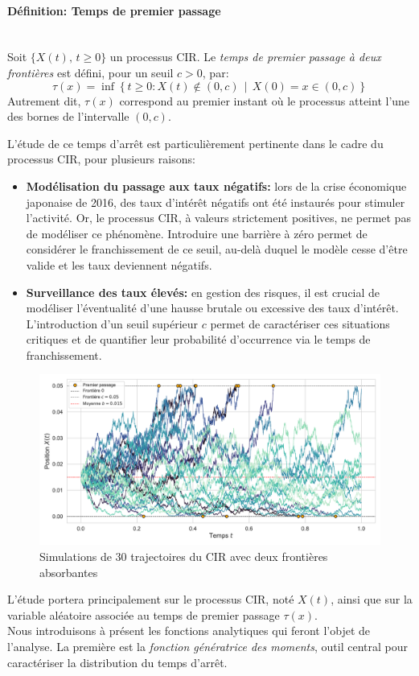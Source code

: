 \paragraph{Définition: Temps de premier passage}\mbox{}\\
Soit $\{X(t),\, t \geq 0\}$ un processus \acs{CIR}. Le \textit{temps de premier passage à deux frontières} est défini, pour un seuil $c > 0$, par:
\begin{equation}\label{fpt_definition}
    \tau(x) = \inf \left\{ t \geq 0: X(t) \notin (0, c) \,\middle|\, X(0) = x \in (0, c) \right\}
\end{equation}
Autrement dit, $\tau(x)$ correspond au premier instant où le processus atteint l'une des bornes de l'intervalle $(0, c)$. 

L'étude de ce temps d'arrêt est particulièrement pertinente dans le cadre du processus \acs{CIR}, pour plusieurs raisons:
\begin{itemize}
    \item \textbf{Modélisation du passage aux taux négatifs:} lors de la crise économique japonaise de 2016, des taux d'intérêt négatifs ont été instaurés pour stimuler l'activité. Or, le processus \acs{CIR}, à valeurs strictement positives, ne permet pas de modéliser ce phénomène. Introduire une barrière à zéro permet de considérer le franchissement de ce seuil, au-delà duquel le modèle cesse d'être valide et les taux deviennent négatifs.
    \item \textbf{Surveillance des taux élevés:} en gestion des risques, il est crucial de modéliser l'éventualité d'une hausse brutale ou excessive des taux d'intérêt. L'introduction d'un seuil supérieur $c$ permet de caractériser ces situations critiques et de quantifier leur probabilité d'occurrence via le temps de franchissement.
\end{itemize}
\begin{figure}[htb]
    \centering
    \includegraphics[width=0.9\linewidth]{img/intro/cir_first_passage.pdf}
    \caption{Simulations de 30 trajectoires du \acs{CIR} avec deux frontières absorbantes}\label{fig:FPTCIR}
\end{figure}
\FloatBarrier L'étude portera principalement sur le processus \acs{CIR}, noté $X(t)$, ainsi que sur la variable aléatoire associée au temps de premier passage $\tau(x)$.\\
Nous introduisons à présent les fonctions analytiques qui feront l'objet de l'analyse. La première est la \textit{fonction génératrice des moments}, outil central pour caractériser la distribution du temps d'arrêt.
